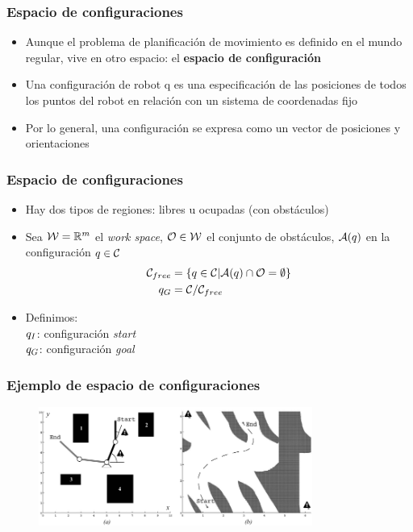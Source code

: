 \begin{frame}
	\frametitle{Espacio de configuraciones}
	
	\begin{itemize}
		\item Aunque el problema de planificación de movimiento es 		definido en el mundo regular, vive en otro espacio: el {\bf espacio de configuración}
		\item Una configuración de robot q es una especificación de las posiciones de todos los puntos del robot en relación con un sistema de coordenadas fijo
		\item Por lo general, una configuración se expresa como un vector de posiciones y orientaciones
	\end{itemize}

	
\end{frame}

\begin{frame}
	\frametitle{Espacio de configuraciones}
	\begin{itemize}
		\item Hay dos tipos de regiones: libres u ocupadas (con obstáculos)
		\item Sea $\mathcal{W} = \mathbb{R}^{m}$ el \emph{work space}, $\mathcal{O} \in \mathcal{W}$ el conjunto de obstáculos, $\mathcal{A}(q)$ en la configuración $q \in \mathcal{C}$
		\begin{align*}
			 \mathcal{C}_{free} &= \left\lbrace q \in \mathcal{C} | \mathcal{A}(q) \cap \mathcal{O} =  \emptyset \right\rbrace\\
			 q_{G} &= \mathcal{C} / \mathcal{C}_{free}
		\end{align*}
	
		\item Definimos:\\
		$q_{I}$: configuración \emph{start}\\
		$q_{G}$: configuración \emph{goal}
		
	
	\end{itemize}
	
\end{frame}

\begin{frame}
	\frametitle{Ejemplo de espacio de configuraciones}
	
	\begin{figure}[!h]
		\includegraphics[width=0.8\textwidth]{images/configuration_space_manipulator.pdf}
	\end{figure}
	
\end{frame}


